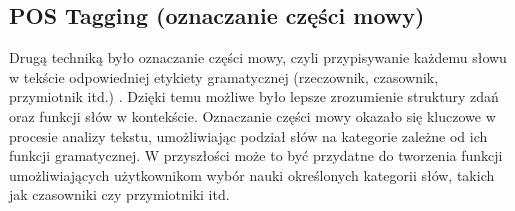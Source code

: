 \subsection*{POS Tagging (oznaczanie części mowy)}
Drugą techniką było oznaczanie części mowy, czyli przypisywanie każdemu słowu w tekście odpowiedniej etykiety gramatycznej (rzeczownik, czasownik, przymiotnik itd.)  \cite{NLPforNLP}. Dzięki temu możliwe było lepsze zrozumienie struktury zdań oraz funkcji słów w kontekście. Oznaczanie części mowy okazało się kluczowe w procesie analizy tekstu, umożliwiając podział słów na kategorie zależne od ich funkcji gramatycznej. W przyszłości może to być przydatne do tworzenia funkcji umożliwiających użytkownikom wybór nauki określonych kategorii słów, takich jak czasowniki czy przymiotniki itd.



